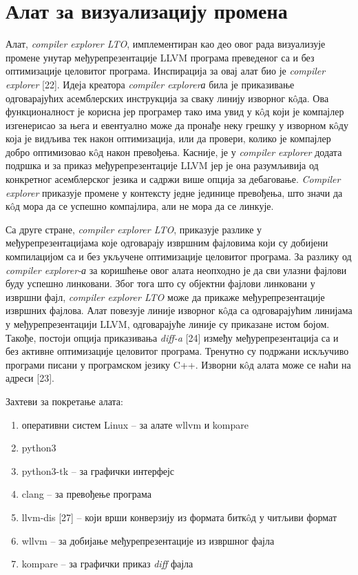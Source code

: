 \documentclass[12pt,oneside]{memoir}
\begin{document}
\chapter{Алат за визуализацију промена}

Алат, \textit{compiler explorer LTO}, имплементиран као део овог рада визуализује
промене унутар међурепрезентације LLVM програма 
преведеног са и без оптимизације целовитог програма.
Инспирација за овај алат био је \textit{compiler explorer} [22].
Идеја креатора \textit{compiler explorerа} била је приказивање одговарајућих асемблерских
инструкција за сваку линију изворног к\^{o}да.
Ова функционалност је корисна јер програмер тако има увид у к\^{o}д који је 
компајлер изгенерисао за њега и евентуално може да пронађе неку грешку у 
изворном к\^{o}ду која је видљива тек након оптимизација, или да провери, колико је компајлер добро оптимизовао к\^{o}д након превођења.
Касније, је у \textit{compiler explorer} додата подршка и за приказ међурепрезентације LLVM 
јер је она разумљивија од конкретног асемблерског језика и садржи више опција
за дебаговање.
\textit{Compiler explorer} приказује промене у контексту једне јединице превођења,
 што значи да к\^{o}д мора да се успешно компајлира, али не мора да се линкује. 
 
Са друге стране, \textit{compiler explorer LTO}, 
приказује разлике у међурепрезентацијама које одговарају извршним фајловима који су
добијени компилацијом 
са и без укључене оптимизације целовитог програма.
За разлику од \textit{compiler explorer-а} за коришћење овог алата неопходно је да сви
улазни фајлови буду успешно линковани.
Због тога што су објектни фајлови линковани у извршни фајл, \textit{compiler explorer LTO} може да прикаже 
међурепрезентације извршних фајлова.
Алат повезује линије изворног к\^{o}да са одговарајућим линијама у међурепрезентацији LLVM, одговарајуће линије су приказане истом бојом.
Такође, постоји опција приказивања \textit{diff-a} [24] између међурепрезентација са и без
активне оптимизације целовитог програма.
Тренутно су подржани искључиво програми писани у програмском језику C++.
Изворни  к\^{o}д алата може се наћи на адреси [23].

Захтеви за покретање алата:
\begin{enumerate}
\item оперативни систем Linux -- за алате wllvm и kompare
\item python3
\item python3-tk -- за графички интерфејс
\item clang -- за превођење програма
\item llvm-dis [27] --  који врши конверзију из формата битк\^{o}д у
			читљиви формат
\item wllvm -- за добијање међурепрезентације из извршног фајла
\item kompare -- за графички приказ \textit{diff} фајла
\end{enumerate}
\end{document}
